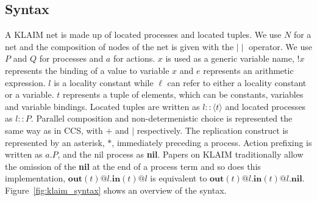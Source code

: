 	\subsection{Syntax}
	A KLAIM net is made up of located processes and located tuples. We use $N$ 
	for a net and the composition of nodes of the net is given with the 
	$\mid\mid$ operator. We use $P$ and $Q$ for processes and $a$ for actions.
	$x$ is used as a generic variable name, $!x$ represents the binding of a 
	value to variable $x$ and $e$ represents an arithmetic 
	expression. $l$ is a locality constant while $\ell$ can refer to either a 
	locality constant or a variable. $t$ represents a tuple of 
	elements, which can be constants, variables and variable bindings. 
	Located tuples are written as $l::\langle t\rangle$ and 
	located processes as $l::P$. Parallel composition and non-determenistic 
	choice is represented the same way as in CCS, with $+$ and $\mid$ 
	respectively. The replication construct is represented by an asterisk, $*$, 
	immediately preceding a process. Action prefixing is written as $a . P$, and 
	the nil process as \textbf{\textsf{nil}}. Papers on KLAIM traditionally 
	allow the omission of the \textbf{\textbf{nil}} at the end of a process term 
	and so does this implementation, $\mathbf{out}(t)@l . \mathbf{in}(t)@l$ is 
	equivalent to $\mathbf{out}(t)@l . \mathbf{in}(t)@l . \mathbf{nil}$. 
	Figure~\ref{fig:klaim_syntax} shows an overview of the syntax. 
